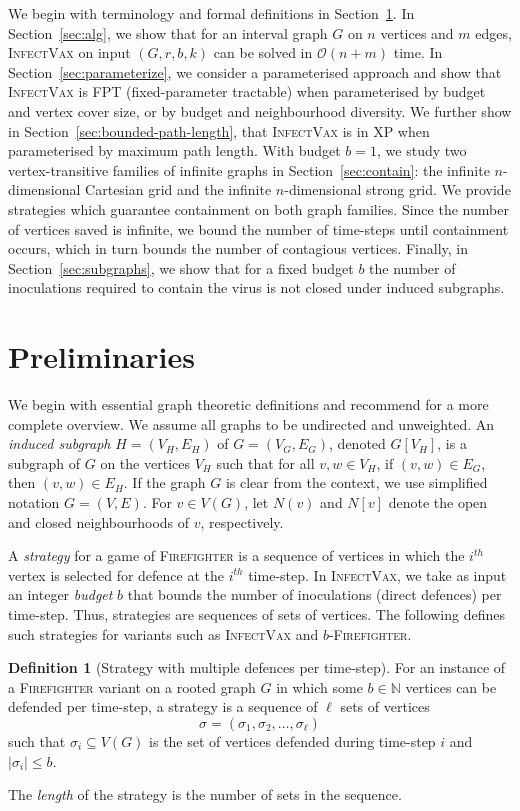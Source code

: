 \documentclass[unknownkeysallowed]{article}
\theoremstyle{definition}\newtheorem{strategy}{Strategy}
\newtheorem{definition}[theorem]{Definition}
\theoremstyle{definition}\newtheorem{notation}{Notation}[theorem]
\newcommand*{\Fire}{\textup{\textsc{Firefighter}}\xspace} %
\newcommand*{\bFire}{$b$-\Fire} %
\newcommand*{\IV}{\textup{\textsc{InfectVax}}\xspace}
\newcommand*{\nat}{\in\mathbb{N}}
\begin{document}
We begin with terminology and formal definitions in Section~\ref{sec:problem_definition}.  In Section~\ref{sec:alg}, we show that for an interval graph $G$ on $n$ vertices and $m$ edges, \IV on input $(G,r,b,k)$ can be solved in $\mathcal{O}(n+m)$ time.  In Section~\ref{sec:parameterize}, we consider a parameterised approach and show that \IV is FPT (fixed-parameter tractable) when parameterised by budget and vertex cover size, or by budget and neighbourhood diversity. We further show in Section~\ref{sec:bounded-path-length}, that \IV is in XP when parameterised by maximum path length.  With budget $b=1$, we study two vertex-transitive families of infinite graphs in Section~\ref{sec:contain}: the infinite $n$-dimensional Cartesian grid and the infinite $n$-dimensional strong grid.  We provide strategies which guarantee containment on both graph families.  Since the number of vertices saved is infinite, we bound the number of time-steps until containment occurs, which in turn bounds the number of contagious vertices.  Finally, in Section~\ref{sec:subgraphs}, we show that for a fixed budget $b$ the number of inoculations required to contain the virus is not closed under induced subgraphs.

\section{Preliminaries}\label{sec:problem_definition}


We begin with essential graph theoretic definitions and recommend \cite{wilson_1996} for a more complete overview.  We assume all graphs to be undirected and unweighted. An \emph{induced subgraph} $H=(V_H, E_H)$ of $G=(V_G, E_G)$, denoted $G[V_H]$, is a subgraph of $G$ on the vertices $V_H$ such that for all $v, w\in V_H$, if $(v, w)\in E_G$, then $(v, w)\in E_H$. If the graph $G$ is clear from the context, we use simplified notation $G=(V,E)$.
For $v\in V(G)$, let $N(v)$ and $N[v]$ denote the open and closed neighbourhoods of $v$, respectively. 

A \emph{strategy} for a game of \Fire is a sequence of vertices in which the $i^{th}$ vertex is selected for defence at the $i^{th}$ time-step. 
In \IV, we take as input an integer \emph{budget} $b$ that bounds the number of inoculations (direct defences) per time-step. Thus, strategies are sequences of sets of vertices. The following defines such strategies for variants such as \IV and \bFire.

\begin{definition}[Strategy with multiple defences per time-step]\label{def:strategy}
    For an instance of a \Fire variant on a rooted graph $G$ in which some $b\nat$ vertices can be defended per time-step, a strategy is a sequence of $\ell$ sets of vertices 
    $$\sigma = (\sigma_1,\sigma_2,\dots,\sigma_{\ell})$$
 such that $\sigma_i \subseteq V(G)$ is the set of vertices defended during time-step $i$ and $|\sigma_i| \leq b$.
 
    The \emph{length} of the strategy is the number of sets in the sequence.
\end{definition}
\end{document}
